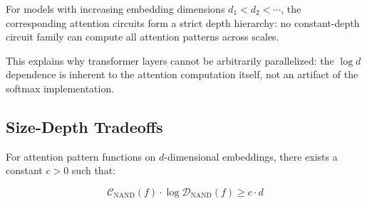 \begin{corollary}






For models with increasing embedding dimensions $d_1 < d_2 < \cdots$, the corresponding attention circuits form a strict depth hierarchy: no constant-depth circuit family can compute all attention patterns across scales.






\end{corollary}













This explains why transformer layers cannot be arbitrarily parallelized: the $\log d$ dependence is inherent to the attention computation itself, not an artifact of the softmax implementation.













\subsection{Size-Depth Tradeoffs}













\begin{theorem}






For attention pattern functions on $d$-dimensional embeddings, there exists a constant $c > 0$ such that:






\[






\mathcal{C}_{\text{NAND}}(f) \cdot \log \mathcal{D}_{\text{NAND}}(f) \geq c \cdot d






\]






\end{theorem}













